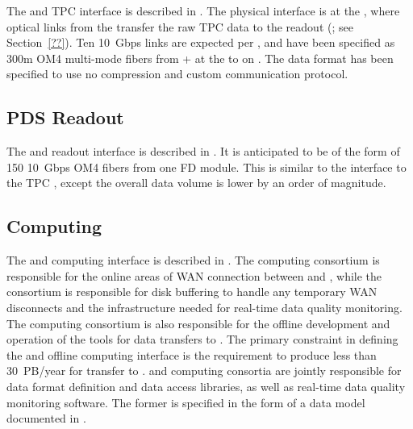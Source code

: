 The  and TPC  interface is described in
. The physical interface is at the , where optical links from the  transfer
the raw TPC data to the   readout (; see
Section~\ref{??}). Ten \SI{10}{Gbps} links are expected per , and have
been specified as 300m OM4 multi-mode fibers from + at the  to
 on . The data format has been specified to use no
compression and custom communication protocol.

\subsection{PDS Readout}

The  and  readout interface is described in
. It is anticipated to
be of the form of 150  \SI{10}{Gbps} OM4 fibers from one FD module. 
This
is similar to the interface to the TPC , except the overall
data volume is lower by an order of magnitude.

\subsection{Computing}

The  and computing interface is described in .
 The computing consortium %
 is responsible for the online areas of WAN connection between \surf and
\fnal, while the  consortium is responsible for disk buffering
to handle any temporary WAN disconnects and the infrastructure needed
for real-time data quality monitoring.  The computing consortium 
is also
responsible for the offline development and operation of the tools for data
transfers to \fnal. The primary
constraint in defining the  and offline computing interface is the
requirement to produce less than \SI{30}{PB/year} %
for transfer to
\fnal.  and %
computing consortia are jointly responsible for data
format definition and data access libraries, as well as real-time data
quality monitoring software. The former is specified in the form of a 
data model documented in .

